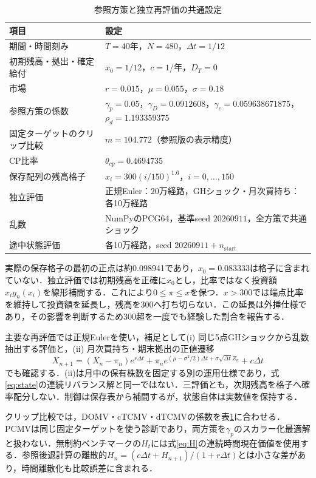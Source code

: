 \documentclass[11pt,a4paper]{article}
\numberwithin{equation}{section}
\numberwithin{table}{section}
\numberwithin{figure}{section}
\theoremstyle{plain}
\theoremstyle{definition}
\begin{document}
\begin{table}[htbp]\centering\small
\caption{参照方策と独立再評価の共通設定}\label{tab:params}
\begin{tabularx}{\textwidth}{p{56mm}X}
\toprule 項目 & 設定 \\ \midrule
期間・時間刻み & $T=40$年，$N=480$，$\Delta t=1/12$ \\
初期残高・拠出・確定給付 & $x_0=1/12$，$c=1$/年，$D_T=0$ \\
市場 & $r=0.015$，$\mu=0.055$，$\sigma=0.18$ \\
参照方策の係数 & $\gamma_p=0.05$，$\gamma_D=0.0912608$，$\gamma_c=0.059638671875$，$\rho_d=1.193359375$ \\
固定ターゲットのクリップ比較 & $m=104.772$（参照版の表示精度） \\
CP比率 & $\theta_{cp}=0.4694735$ \\
保存配列の残高格子 & $x_i=300(i/150)^{1.6}$，$i=0,\ldots,150$ \\
独立評価 & 正規Euler：20万経路，GHショック・月次買持ち：各10万経路 \\
乱数 & NumPyのPCG64，基準seed $20260911$，全方策で共通ショック \\
途中状態評価 & 各10万経路，seed $20260911+n_{\mathrm{start}}$ \\
\bottomrule\end{tabularx}\end{table}

実際の保存格子の最初の正点は約0.098941であり，$x_0=0.083333$は格子に含まれていない．独立評価では初期残高を正確に$x_0$とし，比率ではなく投資額$x_ig_n(x_i)$を線形補間する．これにより$0\leq\pi\leq x$を保つ．$x>300$では端点比率を維持して投資額を延長し，残高を300へ打ち切らない．この延長は外挿仕様であり，その影響を判断するため300超を一度でも経験した割合を報告する．

主要な再評価では正規Eulerを使い，補足として(i) 同じ5点GHショックから乱数抽出する評価と，(ii) 月次買持ち・期末拠出の正値遷移
\begin{equation}
X_{n+1}=(X_n-\pi_n)e^{r\Delta t}
+\pi_ne^{(\mu-\sigma^2/2)\Delta t+\sigma\sqrt{\Delta t}Z_n}+c\Delta t
\label{eq:buyhold}
\end{equation}
でも確認する．(ii)は月中の保有株数を固定する別の運用仕様であり，式\eqref{eq:state}の連続リバランス解と同一ではない．三評価とも，次期残高を格子へ確率配分しない．制御は保存表から補間するが，状態自体は実数値を保持する．

クリップ比較では，DOMV・cTCMV・dTCMVの係数を表\ref{tab:params}に合わせる．PCMVは同じ固定ターゲットを使う診断であり，両方策を$\gamma_p$のスカラー化最適解と扱わない．無制約ベンチマークの$H_t$には式\eqref{eq:H}の連続時間現在価値を使用する．参照後退計算の離散的$H_n=(c\Delta t+H_{n+1})/(1+r\Delta t)$とは小さな差があり，時間離散化も比較誤差に含まれる．
\end{document}
